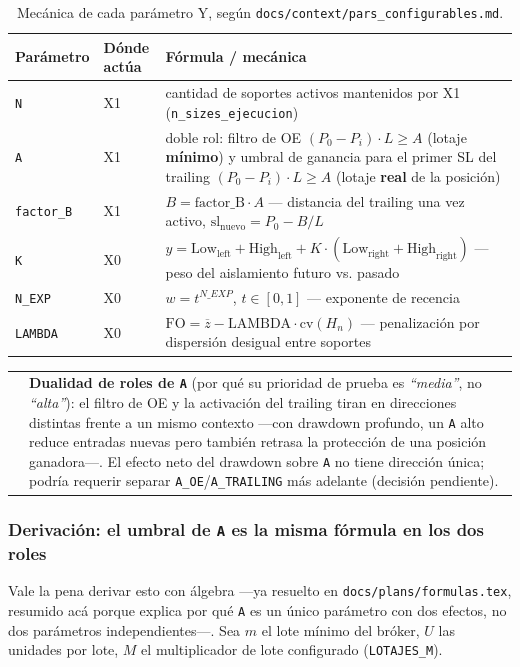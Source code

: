 \documentclass[11pt,a4paper]{article}
\makeatletter
\newcommand{\code}[1]{\texttt{\small #1}}
\newenvironment{nota}{%
  \par\medskip\noindent
  \begin{tabular}{@{}p{0.4em}@{\hspace{8pt}}p{\dimexpr\linewidth-2em\relax}@{}}
  \textcolor{cnaranja}{\rule{3pt}{1.1em}} &
}{\end{tabular}\par\medskip}
\newcommand{\dq}[1]{\emph{``#1''}}
\makeatother
\begin{document}
\begin{table}[h]
\centering
\small
\begin{tabularx}{\linewidth}{@{}l l X@{}}
\toprule
\textbf{Parámetro} & \textbf{Dónde actúa} & \textbf{Fórmula / mecánica} \\
\midrule
\code{N} & X1 & cantidad de soportes activos mantenidos por X1
  (\code{n\_sizes\_ejecucion}) \\
\code{A} & X1 & doble rol: filtro de OE \((P_0-P_i)\cdot L \geq A\) (lotaje
  \textbf{mínimo}) y umbral de ganancia para el primer SL del trailing
  \((P_0-P_i)\cdot L \geq A\) (lotaje \textbf{real} de la posición) \\
\code{factor\_B} & X1 & \(B = \text{factor\_B} \cdot A\) — distancia del trailing una
  vez activo, \(\mathrm{sl}_{\mathrm{nuevo}} = P_0 - B/L\) \\
\code{K} & X0 & \(y = \text{Low}_{\mathrm{left}} + \text{High}_{\mathrm{left}} +
  K\cdot(\text{Low}_{\mathrm{right}} + \text{High}_{\mathrm{right}})\) — peso del
  aislamiento futuro vs. pasado \\
\code{N\_EXP} & X0 & \(w = t^{N\_EXP}\), \(t\in[0,1]\) — exponente de recencia \\
\code{LAMBDA} & X0 & \(\mathrm{FO} = \overline{z} - \mathrm{LAMBDA}\cdot
  \mathrm{cv}(H_n)\) — penalización por dispersión desigual entre soportes \\
\bottomrule
\end{tabularx}
\caption{Mecánica de cada parámetro Y, según \code{docs/context/pars\_configurables.md}.}
\end{table}

\begin{nota}
\textbf{Dualidad de roles de \code{A}} (por qué su prioridad de prueba es \dq{media}, no
\dq{alta}): el filtro de OE y la activación del trailing tiran en direcciones distintas
frente a un mismo contexto —con drawdown profundo, un \code{A} alto reduce entradas nuevas
pero también retrasa la protección de una posición ganadora—. El efecto neto del drawdown
sobre \code{A} no tiene dirección única; podría requerir separar
\code{A\_OE}/\code{A\_TRAILING} más adelante (decisión pendiente).
\end{nota}

\subsubsection*{Derivación: el umbral de \code{A} es la misma fórmula en los dos roles}

Vale la pena derivar esto con álgebra —ya resuelto en
\code{docs/plans/formulas.tex}, resumido acá porque explica por qué \code{A} es un único
parámetro con dos efectos, no dos parámetros independientes—. Sea \(m\) el lote mínimo del
bróker, \(U\) las unidades por lote, \(M\) el multiplicador de lote configurado
(\code{LOTAJES\_M}).
\end{document}
